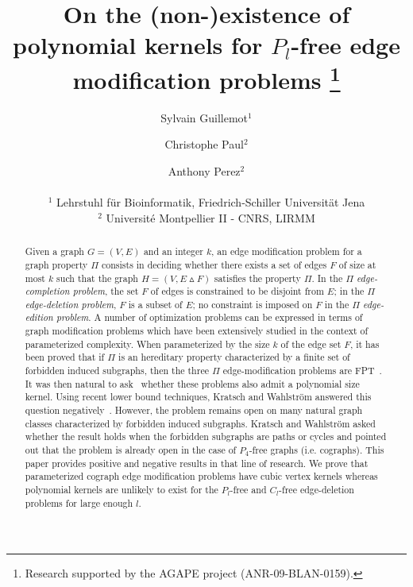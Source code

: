 \documentclass[11pt]{article}
\begin{document}
\title{\textbf{On the (non-)existence of polynomial kernels for $P_l$-free edge modification problems}
\thanks{Research supported by the AGAPE project  (ANR-09-BLAN-0159).}}


\author{Sylvain Guillemot$^1$ \and Christophe Paul$^2$ \and Anthony Perez$^2$ \\\\
$^1$ Lehrstuhl f\"ur Bioinformatik, Friedrich-Schiller Universit\"at Jena \\
$^2$ Universit\'e Montpellier II - CNRS, LIRMM}


\date{}

\maketitle


\begin{abstract}
Given a graph $G=(V,E)$ and an integer $k$, an edge modification problem for a graph property $\Pi$ consists in deciding whether there exists a set of edges $F$ of size at most $k$ such that the graph $H=(V,E\vartriangle F)$ satisfies the property $\Pi$. In the $\Pi$ \emph{edge-completion problem}, the set $F$ of edges is constrained to be disjoint from $E$; in the $\Pi$ \emph{edge-deletion problem}, $F$ is a subset of $E$; no constraint is imposed on $F$ in the $\Pi$ \emph{edge-edition problem}. 
A number of optimization problems can be expressed in terms of graph modification problems which have been extensively studied in the context of parameterized complexity. When parameterized by the size $k$ of the edge set $F$, it has been proved that if $\Pi$ is an hereditary property characterized by a finite set of forbidden induced subgraphs, then the three $\Pi$ edge-modification problems are FPT~\cite{Cai96}. It was then natural to ask~\cite{Cai96} whether these problems also admit a polynomial size kernel. Using recent lower bound techniques, Kratsch and Wahlstr\"om answered this question negatively~\cite{KW09}. However, the problem remains open on many natural graph classes characterized by forbidden induced subgraphs. Kratsch and Wahlstr\"om asked whether the result holds when the forbidden subgraphs are paths or cycles and pointed out that the problem is already open in the case of $P_4$-free graphs (i.e. cographs). This paper provides positive and negative results in that line of research. We prove that parameterized cograph edge modification problems have cubic vertex kernels whereas polynomial kernels are unlikely to exist for the $P_l$-free and $C_l$-free edge-deletion problems for large enough $l$.
\end{abstract}
\end{document}
